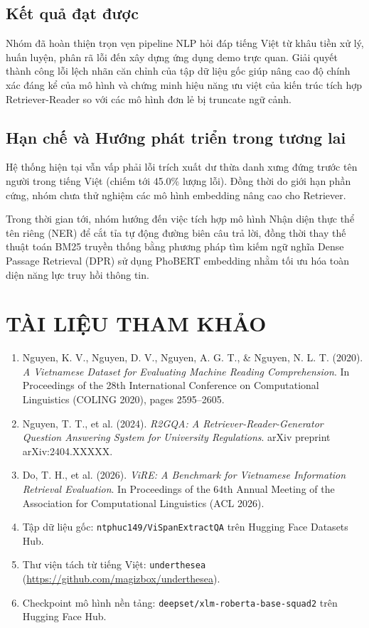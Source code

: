 \documentclass[12pt, a4paper]{article}
\begin{document}
\subsection{Kết quả đạt được}
Nhóm đã hoàn thiện trọn vẹn pipeline NLP hỏi đáp tiếng Việt từ khâu tiền xử lý, huấn luyện, phân rã lỗi đến xây dựng ứng dụng demo trực quan. Giải quyết thành công lỗi lệch nhãn căn chỉnh của tập dữ liệu gốc giúp nâng cao độ chính xác đáng kể của mô hình và chứng minh hiệu năng ưu việt của kiến trúc tích hợp Retriever-Reader so với các mô hình đơn lẻ bị truncate ngữ cảnh.

\subsection{Hạn chế và Hướng phát triển trong tương lai}
Hệ thống hiện tại vẫn vấp phải lỗi trích xuất dư thừa danh xưng đứng trước tên người trong tiếng Việt (chiếm tới 45.0\% lượng lỗi). Đồng thời do giới hạn phần cứng, nhóm chưa thử nghiệm các mô hình embedding nâng cao cho Retriever. 

Trong thời gian tới, nhóm hướng đến việc tích hợp mô hình Nhận diện thực thể tên riêng (NER) để cắt tỉa tự động đường biên câu trả lời, đồng thời thay thế thuật toán BM25 truyền thống bằng phương pháp tìm kiếm ngữ nghĩa Dense Passage Retrieval (DPR) sử dụng PhoBERT embedding nhằm tối ưu hóa toàn diện năng lực truy hồi thông tin.

\section{TÀI LIỆU THAM KHẢO}
\begin{enumerate}
    \item Nguyen, K. V., Nguyen, D. V., Nguyen, A. G. T., \& Nguyen, N. L. T. (2020). \textit{A Vietnamese Dataset for Evaluating Machine Reading Comprehension}. In Proceedings of the 28th International Conference on Computational Linguistics (COLING 2020), pages 2595–2605.
    \item Nguyen, T. T., et al. (2024). \textit{R2GQA: A Retriever-Reader-Generator Question Answering System for University Regulations}. arXiv preprint arXiv:2404.XXXXX.
    \item Do, T. H., et al. (2026). \textit{ViRE: A Benchmark for Vietnamese Information Retrieval Evaluation}. In Proceedings of the 64th Annual Meeting of the Association for Computational Linguistics (ACL 2026).
    \item Tập dữ liệu gốc: \texttt{ntphuc149/ViSpanExtractQA} trên Hugging Face Datasets Hub.
    \item Thư viện tách từ tiếng Việt: \texttt{underthesea} (\url{https://github.com/magizbox/underthesea}).
    \item Checkpoint mô hình nền tảng: \texttt{deepset/xlm-roberta-base-squad2} trên Hugging Face Hub.
  \end{enumerate}
\end{document}

